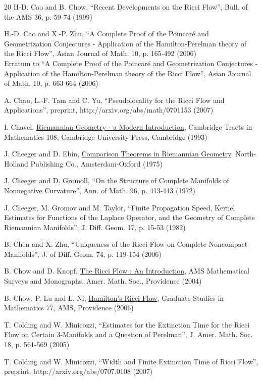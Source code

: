 \begin{thebibliography}{20}
 H-D. Cao and B. Chow,
``Recent Developments on the Ricci Flow'', Bull. of the AMS 36, p. 59-74 (1999)

 H.-D. Cao and X.-P. Zhu,
``A Complete Proof of the Poincar\'e and Geometrization Conjectures - Application of the Hamilton-Perelman theory of the Ricci Flow'',
Asian Journal of Math. 10, p. 165-492 (2006) \\
Erratum to
``A Complete Proof of the Poincar\'e and Geometrization Conjectures - Application of the Hamilton-Perelman theory of the Ricci Flow'',  Asian Journal of Math. 10, p. 663-664 (2006)

 A. Chau, L.-F. Tam and C. Yu,
``Pseudolocality for the Ricci Flow and Applications'',
preprint, http://arxiv.org/abs/math/0701153 (2007)

 I. Chavel,
\underline{Riemannian Geometry - a Modern Introduction},
Cambridge Tracts in Mathematics 108,
Cambridge University Press, Cambridge (1993)

 J. Cheeger and D. Ebin,
\underline{Comparison Theorems in Riemannian Geometry}.
North-Holland Publishing Co., Amsterdam-Oxford (1975)

 J. Cheeger and D. Gromoll,
``On the Structure of Complete Manifolds of Nonnegative Curvature'',
Ann. of Math. 96, p. 413-443 (1972)

 J. Cheeger, M. Gromov and M. Taylor,
``Finite Propagation Speed, Kernel Estimates for Functions of the
Laplace Operator, and the Geometry of Complete Riemannian Manifolds'',
J. Diff. Geom. 17, p. 15-53 (1982)

 B. Chen and X. Zhu,
``Uniqueness of the Ricci Flow on Complete
Noncompact Manifolds'', J. of Diff. Geom. 74, p. 119-154
(2006)

 B. Chow and D. Knopf,
\underline{The Ricci Flow : An Introduction}, AMS Mathematical Surveys and
Monographs, Amer. Math. Soc., Providence (2004)

 B. Chow, P. Lu and L. Ni, \underline{Hamilton's Ricci Flow},
Graduate Studies in Mathematics 77, AMS, Providence (2006)

 T. Colding and W. Minicozzi,
``Estimates for the Extinction Time for the Ricci Flow on Certain 3-Manifolds and a
Question of Perelman'',
J. Amer. Math. Soc. 18, p.  561-569 (2005)

 T. Colding and W. Minicozzi,
``Width and Finite Extinction Time of Ricci Flow'',
preprint, http://arxiv.org/abs/0707.0108 (2007)


\end{thebibliography}
